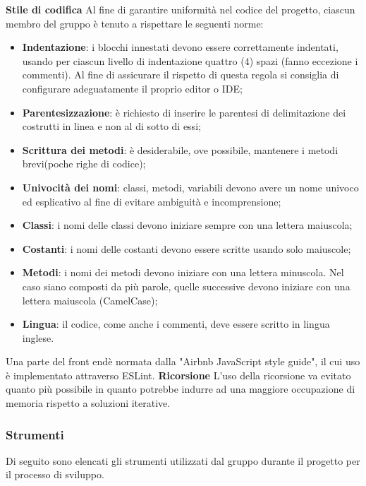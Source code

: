 \textbf{Stile di codifica} \newline \newline
Al fine di garantire uniformità nel codice del progetto, ciascun membro del 
gruppo è tenuto a rispettare le seguenti norme:
	\begin{itemize}
		\item \textbf{Indentazione}: i blocchi innestati devono essere correttamente 
			indentati, usando per ciascun livello di indentazione quattro (4) spazi (fanno 
			eccezione i commenti). Al fine di assicurare il rispetto di questa regola si 
			consiglia di configurare adeguatamente il proprio editor o IDE;
		\item \textbf{Parentesizzazione}: è richiesto di inserire le parentesi di 
			delimitazione dei costrutti in linea e non al di sotto di essi;
		\item \textbf{Scrittura dei metodi}: è desiderabile, ove possibile, 
			mantenere i metodi brevi(poche righe di codice);
		\item \textbf{Univocità dei nomi}: classi, metodi, variabili devono avere un 
			nome univoco	ed esplicativo al fine di evitare ambiguità e incomprensione;
		\item \textbf{Classi}: i nomi delle classi devono iniziare sempre con una 
			lettera maiuscola;		
		\item \textbf{Costanti}: i nomi delle costanti devono essere scritte usando 
			solo maiuscole;
		\item \textbf{Metodi}: i nomi dei metodi devono iniziare con una lettera 
			minuscola. Nel caso siano composti da più parole, quelle successive devono iniziare con una 
			lettera maiuscola (CamelCase\glo{});
		\item \textbf{Lingua}: il codice, come anche i commenti, deve essere scritto 
			in lingua inglese.
	\end{itemize}
Una parte del front end\glosp è normata dalla "Airbnb JavaScript style 
guide", il cui uso è implementato attraverso ESLint\glo. \newline \newline
\textbf{Ricorsione} \newline \newline
L'uso della ricorsione va evitato quanto più possibile in  quanto potrebbe
indurre ad una maggiore occupazione di memoria rispetto a soluzioni iterative.
	
\subsubsection{Strumenti}
Di seguito sono elencati gli strumenti utilizzati dal gruppo durante il 
progetto per il processo di sviluppo.
		
